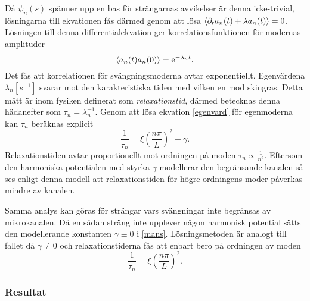 Då $\psi_{n}(s)$ spänner upp en bas för strängarnas avvikelser är denna icke-trivial, lösningarna till ekvationen fås därmed genom att lösa $\ev{\partial_{t}a_{n}(t)+\lambda a_{n}(t)}=0$. Lösningen till denna differentialekvation ger korrelationsfunktionen för modernas amplituder
\begin{equation}
    \ev{a_{n}(t)a_{n}(0)}=\ee^{-\lambda_{n}t}.
\end{equation}
Det fås att korrelationen för svängningsmoderna avtar exponentiellt. Egenvärdena $\lambda_{n} [s^{-1}]$ svarar mot den karakteristiska tiden med vilken en mod skingras. Detta mått är inom fysiken definerat som \emph{relaxationstid}, därmed betecknas denna hädanefter som $\tau_{n}=\lambda_{n}^{-1}$. Genom att lösa ekvation \eqref{egenvard} för egenmoderna kan $\tau_{n}$ beräknas explicit
\begin{equation}
    \frac{1}{\tau_{n}}=\xi\left(\frac{n\pi}{L}\right)^{2}+\gamma.
\end{equation}
Relaxationstiden avtar proportionellt mot ordningen på moden  $\tau_{n}\propto\frac{1}{n^2}$. Eftersom den harmoniska potentialen med styrka $\gamma$ modellerar den begränsande kanalen så ses enligt denna modell att relaxationstiden för högre ordningens moder påverkas mindre av kanalen. 

Samma analys kan göras för strängar vars svängningar inte begränsas av mikrokanalen. Då en sådan sträng inte upplever någon harmonisk potential sätts den modellerande konstanten $\gamma\equiv0$ i \eqref{mans}. Lösningsmetoden är analogt till fallet då $\gamma\neq0$ och relaxationstiderna fås att enbart bero på ordningen av moden 
\begin{equation}
    \frac{1}{\tau_{n}}=\xi\left(\frac{n\pi}{L}\right)^{2}.
\end{equation}



\subsubsection{Resultat -- }

 

\begin{figure}
    \centering
    
    \caption{}
    \label{fig:cosconf}
\end{figure}

\begin{figure}
    \centering
    
    \caption{}
    \label{fig:cosnonconf}
\end{figure}

